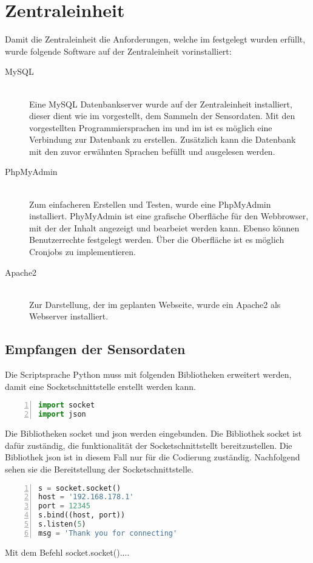 \section{Zentraleinheit}%
Damit die Zentraleinheit die Anforderungen, welche im  festgelegt wurden erfüllt, wurde folgende Software auf der Zentraleinheit vorinstalliert:
\begin{description}
	\item[MySQL] \hfill \\
	Eine MySQL Datenbankserver wurde auf der Zentraleinheit installiert, dieser dient wie im  vorgestellt, dem Sammeln der Sensordaten. Mit den vorgestellten Programmiersprachen im  und im  ist es möglich eine Verbindung zur Datenbank zu erstellen. Zusätzlich kann die Datenbank mit den zuvor erwähnten Sprachen befüllt und ausgelesen werden.
	\item[PhpMyAdmin] \hfill \\
	Zum einfacheren Erstellen und Testen, wurde eine PhpMyAdmin installiert. PhyMyAdmin ist eine grafische Oberfläche für den Webbrowser, mit der der Inhalt angezeigt und bearbeiet werden kann. Ebenso können Benutzerrechte festgelegt werden. Über die Oberfläche ist es möglich Cronjobs zu implementieren.
	\item[Apache2] \hfill \\
	Zur Darstellung, der im  geplanten Webseite, wurde ein Apache2 als Webserver installiert.
\end{description}
\subsection{Empfangen der Sensordaten}
Die Scriptsprache Python muss mit folgenden Bibliotheken erweitert werden, damit eine Socketschnittstelle erstellt werden kann.
\begin{lstlisting}[caption=Einbinden der Bibliotheken für die Schnittstelle,frame=single,numbers=left,language=Python]
import socket
import json
\end{lstlisting}
Die Bibliotheken socket und json werden eingebunden. Die Bibliothek socket ist dafür zuständig, die funktionalität der Socketschnittstellt bereitzustellen. Die Bibliothek json ist in diesem Fall nur für die Codierung zuständig.\hfill
\noindent Nachfolgend sehen sie die Bereitstellung der Socketschnittstelle.
\begin{lstlisting}[caption=Bereitstellen der Socketschnittstelle,frame=single,numbers=left,language=Python]
s = socket.socket()
host = '192.168.178.1'
port = 12345
s.bind((host, port))
s.listen(5)
msg = 'Thank you for connecting'
\end{lstlisting}
Mit dem Befehl socket.socket()....


